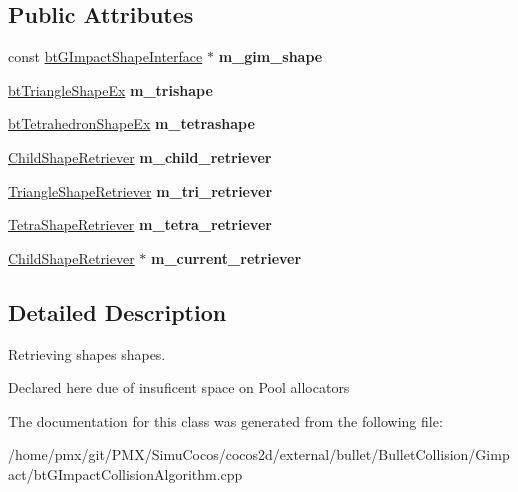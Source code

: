 \subsection*{Public Attributes}
\begin{DoxyCompactItemize}
\item 
\mbox{\label{classGIM__ShapeRetriever_ade758322d7f51e8fe63a7259098738fb}} 
const \hyperlink{classbtGImpactShapeInterface}{bt\+G\+Impact\+Shape\+Interface} $\ast$ {\bfseries m\+\_\+gim\+\_\+shape}
\item 
\mbox{\label{classGIM__ShapeRetriever_a855d898abf44e0ab5883ce6497f3f613}} 
\hyperlink{classbtTriangleShapeEx}{bt\+Triangle\+Shape\+Ex} {\bfseries m\+\_\+trishape}
\item 
\mbox{\label{classGIM__ShapeRetriever_a7536befc5dd5410ef9334459b6b26fa4}} 
\hyperlink{classbtTetrahedronShapeEx}{bt\+Tetrahedron\+Shape\+Ex} {\bfseries m\+\_\+tetrashape}
\item 
\mbox{\label{classGIM__ShapeRetriever_ae224e16a0ddf42cc0d7469ed5762c51e}} 
\hyperlink{classGIM__ShapeRetriever_1_1ChildShapeRetriever}{Child\+Shape\+Retriever} {\bfseries m\+\_\+child\+\_\+retriever}
\item 
\mbox{\label{classGIM__ShapeRetriever_abab3680ffa9c15b65ee81ac47ea02af9}} 
\hyperlink{classGIM__ShapeRetriever_1_1TriangleShapeRetriever}{Triangle\+Shape\+Retriever} {\bfseries m\+\_\+tri\+\_\+retriever}
\item 
\mbox{\label{classGIM__ShapeRetriever_a19566d601cd88d1d814fa8989b03d565}} 
\hyperlink{classGIM__ShapeRetriever_1_1TetraShapeRetriever}{Tetra\+Shape\+Retriever} {\bfseries m\+\_\+tetra\+\_\+retriever}
\item 
\mbox{\label{classGIM__ShapeRetriever_a4795f025c7bf3f9726e59f12ae2a82b4}} 
\hyperlink{classGIM__ShapeRetriever_1_1ChildShapeRetriever}{Child\+Shape\+Retriever} $\ast$ {\bfseries m\+\_\+current\+\_\+retriever}
\end{DoxyCompactItemize}


\subsection{Detailed Description}
Retrieving shapes shapes. 

Declared here due of insuficent space on Pool allocators 

The documentation for this class was generated from the following file\+:\begin{DoxyCompactItemize}
\item 
/home/pmx/git/\+P\+M\+X/\+Simu\+Cocos/cocos2d/external/bullet/\+Bullet\+Collision/\+Gimpact/bt\+G\+Impact\+Collision\+Algorithm.\+cpp\end{DoxyCompactItemize}
